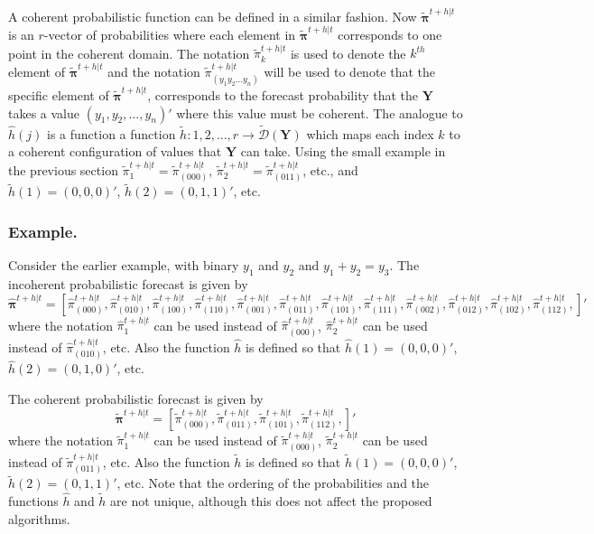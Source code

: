 \documentclass[a4paper,review,12pt,authoryear]{elsarticle}
\newcommand{\bY}{\mathbf{Y}}
\newcommand{\bpi}{\bm{\pi}}
\begin{document}
  A coherent probabilistic function can be defined in a similar fashion. Now $\tilde{\bpi}^{t+h|t}$ is an $r$-vector of probabilities where each element in $\tilde{\bpi}^{t+h|t}$ corresponds to one point in the coherent domain. The notation $\tilde{\pi}_k^{t+h|t}$ is used to denote the $k^{th}$ element of $\tilde{\bpi}^{t+h|t}$ and the notation $\tilde{\pi}_{(y_1 y_2 \dots y_n)}^{t+h|t}$ will be used to denote that the specific element of $\tilde{\bpi}^{t+h|t}$, corresponds to the forecast probability that the $\bY$ takes a value $(y_1,y_2,\dots,y_n)'$ where this value must be coherent. The analogue to $\hat{h}(j)$ is a function a function $\tilde{h}:{1,2,\dots,r}\rightarrow\tilde{\mathcal{D}}(\bY)$ which maps each index $k$ to a coherent configuration of values that $\bY$ can take. Using the small example in the previous section $\tilde{\pi}_1^{t+h|t}=\tilde{\pi}_{(000)}^{t+h|t}$, $\tilde{\pi}_2^{t+h|t}=\tilde{\pi}_{(011)}^{t+h|t}$, etc., and $\tilde{h}(1)=(0,0,0)'$, $\tilde{h}(2)=(0,1,1)'$, etc.
  
  \subsubsection*{\textbf{Example}.}
  
  Consider the earlier example, with binary $y_1$ and $y_2$ and $y_1+y_2=y_3$. The incoherent probabilistic forecast is given by
  \[
    \hat{\bpi}^{t+h|t}= \left[       
      \hat{\pi}^{t+h|t}_{(000)},
       \hat{\pi}^{t+h|t}_{(010)},
       \hat{\pi}^{t+h|t}_{(100)},
       \hat{\pi}^{t+h|t}_{(110)},
       \hat{\pi}^{t+h|t}_{(001)},
       \hat{\pi}^{t+h|t}_{(011)},
       \hat{\pi}^{t+h|t}_{(101)},
       \hat{\pi}^{t+h|t}_{(111)},
       \hat{\pi}^{t+h|t}_{(002)},
       \hat{\pi}^{t+h|t}_{(012)},
       \hat{\pi}^{t+h|t}_{(102)},
       \hat{\pi}^{t+h|t}_{(112)},
       \right]'
  \]
  where the notation $\hat{\pi}^{t+h|t}_{1}$ can be used instead of $\hat{\pi}^{t+h|t}_{(000)}$, $\hat{\pi}^{t+h|t}_{2}$ can be used instead of $\hat{\pi}^{t+h|t}_{(010)}$, etc. Also the function $\hat{h}$ is defined so that $\hat{h}(1)=(0,0,0)'$, $\hat{h}(2)=(0,1,0)'$, etc.
  
  The coherent probabilistic forecast is given by
  \[
  \tilde{\bpi}^{t+h|t}=\left[
  \tilde{\pi}^{t+h|t}_{(000)},
  \tilde{\pi}^{t+h|t}_{(011)},
  \tilde{\pi}^{t+h|t}_{(101)},
  \tilde{\pi}^{t+h|t}_{(112)},
  \right]'\]
  where the notation $\tilde{\pi}^{t+h|t}_{1}$ can be used instead of $\tilde{\pi}^{t+h|t}_{(000)}$, $\tilde{\pi}^{t+h|t}_{2}$ can be used instead of $\tilde{\pi}^{t+h|t}_{(011)}$, etc. Also the function $\tilde{h}$ is defined so that $\tilde{h}(1)=(0,0,0)'$, $\tilde{h}(2)=(0,1,1)'$, etc. Note that the ordering of the probabilities and the functions $\hat{h}$ and $\tilde{h}$ are not unique, although this does not affect the proposed algorithms.
\end{document}
